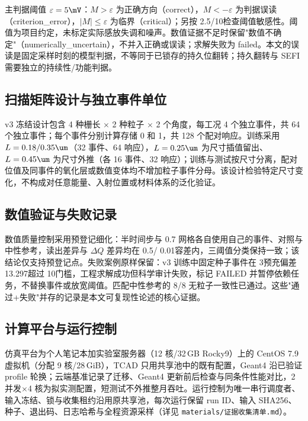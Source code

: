 主判据阈值 $\varepsilon=5\mV$：$M>\varepsilon$ 为正确方向（correct），$M<-\varepsilon$ 为判据误读（criterion\_error），$|M|\leq\varepsilon$ 为临界（critical）；另按 2.5/10\mV 检查阈值敏感性。阈值为项目约定，未标定实际感放失调和噪声。数值证据不足时保留"数值不确定"（numerically\_uncertain），不并入正确或误读；求解失败为 failed。本文的误读是固定采样时刻的模型判据，不等同于已锁存的持久位翻转；持久翻转与 SEFI 需要独立的持续性/功能判据。

\subsection{扫描矩阵设计与独立事件单位}

v3 冻结设计包含 4 种栅长 $\times$ 2 种粒子 $\times$ 2 个角度，每工况 4 个独立事件，共 64 个独立事件；每个事件分别计算存储 0 和 1，共 128 个配对响应。训练采用 $L=0.18/0.35\um$（32 事件、64 响应），$L=0.25\um$ 为尺寸插值留出、$L=0.45\um$ 为尺寸外推（各 16 事件、32 响应）；训练与测试按尺寸分离，配对位值及同事件的氧化层或数值变体均不增加粒子事件分母。该设计检验特定尺寸变化，不构成对任意能量、入射位置或材料体系的泛化验证。

\subsection{数值验证与失败记录}

数值质量控制采用预登记细化：半时间步与 0.7 网格各自使用自己的事件、对照与中性参考，读出差异与 $\Delta Q$ 差异均在 0.5\mV / 0.01\fC 容差内，三阈值分类保持一致；该结论仅支持预登记点。失败案例原样保留：v3 训练中固定种子事件在 3\ns 预充偏差 13.297\uV 超过 10\uV 门槛，工程求解成功但科学审计失败，标记 FAILED 并暂停依赖任务，不替换事件或放宽阈值。匹配中性参考的 8/8 无粒子一致性已通过。这些"通过+失败"并存的记录是本文可复现性论述的核心证据。

\subsection{计算平台与运行控制}

仿真平台为个人笔记本加实验室服务器（12 核/32\,GB Rocky9）上的 CentOS 7.9 虚拟机（分配 9 核/28\,GiB），TCAD 只用共享池中的既有配置，Geant4 沿已验证 profile 轮换；云端基准记录了迁移、Geant4 更新前后检查与同条件性能对比，2 并发$\times$4 核为拟实测配置，短测试不外推整月吞吐。运行控制为唯一串行调度者、输入冻结、锁与收集租约沿用原共享池，每次运行保留 run ID、输入 SHA256、种子、退出码、日志哈希与全程资源采样（详见 \texttt{materials/证据收集清单.md}）。
